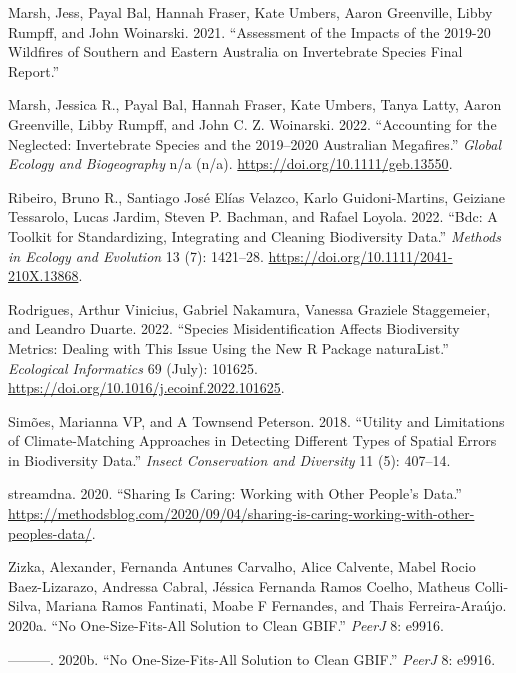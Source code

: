 \documentclass[
  letterpaper,
  DIV=11,
  numbers=noendperiod,
  oneside]{scrreprt}
\newlength{\cslhangindent}
\newlength{\cslentryspacingunit} %
\newenvironment{CSLReferences}[2] %
 {%
  \setlength{\parindent}{0pt}
  \ifodd #1
  \let\oldpar\par
  \def\par{\hangindent=\cslhangindent\oldpar}
  \fi
  \setlength{\parskip}{#2\cslentryspacingunit}
 }%
 {}
\begin{document}
\begin{CSLReferences}{1}{0}
\leavevmode{}%
Marsh, Jess, Payal Bal, Hannah Fraser, Kate Umbers, Aaron Greenville,
Libby Rumpff, and John Woinarski. 2021. {``Assessment of the Impacts of
the 2019-20 Wildfires of Southern and Eastern Australia on Invertebrate
Species Final Report.''}

\leavevmode{}%
Marsh, Jessica R., Payal Bal, Hannah Fraser, Kate Umbers, Tanya Latty,
Aaron Greenville, Libby Rumpff, and John C. Z. Woinarski. 2022.
{``Accounting for the Neglected: {Invertebrate} Species and the
2019--2020 {Australian} Megafires.''} \emph{Global Ecology and
Biogeography} n/a (n/a). \url{https://doi.org/10.1111/geb.13550}.

\leavevmode{}%
Ribeiro, Bruno R., Santiago José Elías Velazco, Karlo Guidoni-Martins,
Geiziane Tessarolo, Lucas Jardim, Steven P. Bachman, and Rafael Loyola.
2022. {``Bdc: {A} Toolkit for Standardizing, Integrating and Cleaning
Biodiversity Data.''} \emph{Methods in Ecology and Evolution} 13 (7):
1421--28. \url{https://doi.org/10.1111/2041-210X.13868}.

\leavevmode{}%
Rodrigues, Arthur Vinicius, Gabriel Nakamura, Vanessa Graziele
Staggemeier, and Leandro Duarte. 2022. {``Species Misidentification
Affects Biodiversity Metrics: {Dealing} with This Issue Using the New
{R} Package {naturaList}.''} \emph{Ecological Informatics} 69 (July):
101625. \url{https://doi.org/10.1016/j.ecoinf.2022.101625}.

\leavevmode{}%
Simões, Marianna VP, and A Townsend Peterson. 2018. {``Utility and
Limitations of Climate-Matching Approaches in Detecting Different Types
of Spatial Errors in Biodiversity Data.''} \emph{Insect Conservation and
Diversity} 11 (5): 407--14.

\leavevmode{}%
streamdna. 2020. {``Sharing Is {Caring}: {Working} with {Other} People's
{Data}.''}
\url{https://methodsblog.com/2020/09/04/sharing-is-caring-working-with-other-peoples-data/}.

\leavevmode{}%
Zizka, Alexander, Fernanda Antunes Carvalho, Alice Calvente, Mabel Rocio
Baez-Lizarazo, Andressa Cabral, Jéssica Fernanda Ramos Coelho, Matheus
Colli-Silva, Mariana Ramos Fantinati, Moabe F Fernandes, and Thais
Ferreira-Araújo. 2020a. {``No One-Size-Fits-All Solution to Clean
{GBIF}.''} \emph{PeerJ} 8: e9916.

\leavevmode{}%
---------. 2020b. {``No One-Size-Fits-All Solution to Clean GBIF.''}
\emph{PeerJ} 8: e9916.

\end{CSLReferences}
\end{document}
